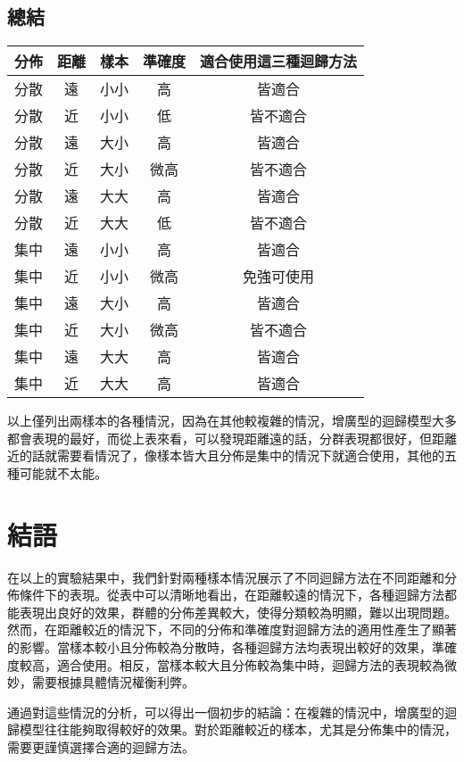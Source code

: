 \subsection{總結}
\begin{center}
  \begin{tabular}{lcccc}
    \hline \rowcolor{magicmint}
    分佈 & 距離  & 樣本  & 準確度 & 適合使用這三種迴歸方法\\\hline\rowcolor{mistyrose}
    分散 & 遠    & 小小  & 高 & 皆適合\\\rowcolor{bubbles}
    分散 & 近    & 小小  & 低 & 皆不適合\\\rowcolor{mistyrose}
    分散 & 遠    & 大小  & 高 & 皆適合\\\rowcolor{bubbles}
    分散 & 近    & 大小  & 微高& 皆不適合\\\rowcolor{mistyrose}
    分散 & 遠    & 大大  & 高 & 皆適合\\\rowcolor{bubbles}
    分散 & 近    & 大大  & 低 & 皆不適合\\\rowcolor{mistyrose}
    集中 & 遠    & 小小  & 高 & 皆適合\\\rowcolor{bubbles}
    集中 & 近    & 小小  & 微高 & 免強可使用\\\rowcolor{mistyrose}
    集中 & 遠    & 大小  & 高 & 皆適合\\\rowcolor{bubbles}
    集中 & 近    & 大小  & 微高 & 皆不適合\\\rowcolor{mistyrose}
    集中 & 遠    & 大大  & 高 & 皆適合\\\rowcolor{bubbles}
    集中 & 近    & 大大  & 高 & 皆適合\\\hline
    \end{tabular}
\end{center}
以上僅列出兩樣本的各種情況，因為在其他較複雜的情況，增廣型的迴歸模型大多都會表現的最好，而從上表來看，可以發現距離遠的話，分群表現都很好，但距離近的話就需要看情況了，像樣本皆大且分佈是集中的情況下就適合使用，其他的五種可能就不太能。


\section{結語}
在以上的實驗結果中，我們針對兩種樣本情況展示了不同迴歸方法在不同距離和分佈條件下的表現。從表中可以清晰地看出，在距離較遠的情況下，各種迴歸方法都能表現出良好的效果，群體的分佈差異較大，使得分類較為明顯，難以出現問題。然而，在距離較近的情況下，不同的分佈和準確度對迴歸方法的適用性產生了顯著的影響。當樣本較小且分佈較為分散時，各種迴歸方法均表現出較好的效果，準確度較高，適合使用。相反，當樣本較大且分佈較為集中時，迴歸方法的表現較為微妙，需要根據具體情況權衡利弊。

通過對這些情況的分析，可以得出一個初步的結論：在複雜的情況中，增廣型的迴歸模型往往能夠取得較好的效果。對於距離較近的樣本，尤其是分佈集中的情況，需要更謹慎選擇合適的迴歸方法。






















